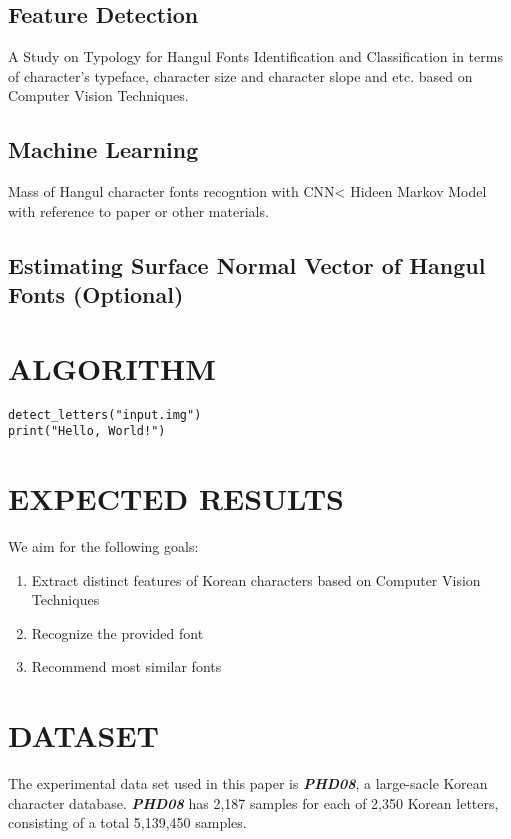 \documentclass[%
 reprint,
nofootinbib,
nobibnotes,
amsmath,amssymb,
aps,
]{revtex4-1}
\begin{document}
\subsection{\label{sec:level3} Feature Detection}
A Study on Typology for Hangul Fonts Identification and Classification in
terms of character's typeface, character size and character slope and etc.
based on Computer Vision Techniques.

\subsection{\label{sec:level3} Machine Learning}
Mass of Hangul character fonts recogntion with CNN< Hideen Markov Model with
reference to paper\cite{tensmeyer} or other materials.

\subsection{\label{sec:level3} Estimating Surface Normal Vector of Hangul
Fonts (Optional)}

\pagebreak
\section{\label{sec:level3} ALGORITHM}

\begin{lstlisting}
detect_letters("input.img")
print("Hello, World!")
\end{lstlisting}


\section{\label{sec:level2}EXPECTED RESULTS}
We aim for the following goals:
\begin{enumerate}[topsep=0pt, itemsep=-1ex, partopsep=1ex, parsep=1ex]
  \item Extract distinct features of Korean characters based on Computer Vision
    Techniques
  \item Recognize the provided font
  \item Recommend most similar fonts
\end{enumerate}

\section{\label{sec:level2}DATASET}
The experimental data set used in this paper is
\textbf{\textit{PHD08}}\cite{ham}, a large-sacle Korean character
database. \textbf{\textit{PHD08}} has 2,187 samples for each of 2,350 Korean letters, consisting
of a total 5,139,450 samples.
\end{document}
